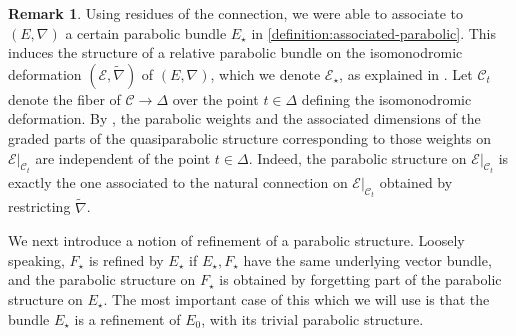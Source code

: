 \documentclass[12 pt]{amsart}
\theoremstyle{plain}
\theoremstyle{definition}
\newtheorem{remark}[subsubsection]{Remark}
\theoremstyle{remark}
\numberwithin{equation}{section}
\begin{document}
\begin{remark}
	\label{remark:parabolic-structure-on-isomonodromic-deformation}
	Using residues of the connection, we were able to associate to $(E,
	\nabla)$ a certain parabolic bundle $E_\star$ in
	\autoref{definition:associated-parabolic}.
	This induces the structure of a relative parabolic bundle on the
	isomonodromic deformation $(\mathscr E, \widetilde{\nabla})$ of $(E,
	\nabla)$, which we denote $\mathscr E_\star$, as explained in
	\cite[\S4.3]{BHH:parabolic}.
	Let $\mathscr C_t$ denote the fiber of $\mathscr C \to \Delta$
	over the point $t \in \Delta$ defining the isomonodromic deformation.
	By \cite[Lemma 4.2]{BHH:parabolic}, the parabolic weights and the
	associated dimensions of the graded parts of the quasiparabolic
	structure corresponding to those weights on $\mathscr E|_{\mathscr C_t}$ are independent
	of the point $t \in \Delta$. Indeed, the parabolic structure on $\mathscr{E}|_{\mathscr{C}_t}$ is exactly the one associated to the natural connection on $\mathscr{E}|_{\mathscr{C}_t}$ obtained by restricting $\widetilde{\nabla}$.
\end{remark}
We next introduce a notion of refinement of a parabolic structure. Loosely speaking, $F_\star$ is refined by $E_\star$ if $E_\star, F_\star$ have the same underlying vector bundle, and the parabolic structure on $F_\star$ is obtained by forgetting part of the parabolic structure on $E_\star$. The most
important case of this which we will use is that the bundle $E_\star$ is a refinement of $E_0$, with its trivial parabolic structure.
\end{document}
